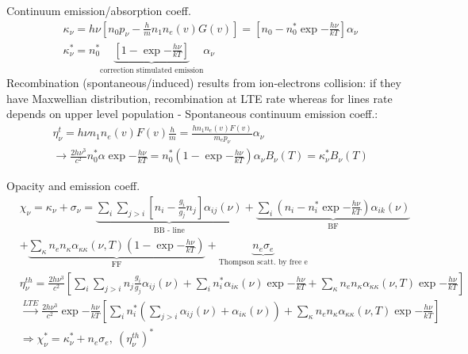 \begin{frame}{Continuum emission/absorption coeff.}
    \begin{align*}
        &\kappa_{\nu}=h\nu[n_0p_{\nu}-\frac{h}{m}n_1n_e(v)G(v)]=[n_0-n_0^*\exp{-\frac{h\nu}{kT}}]\alpha_{\nu}\\
        &\kappa_{\nu}^*=n_0^*\underbrace{[1-\exp{-\frac{h\nu}{kT}}]}_{\text{correction stimulated emission}}\alpha_{\nu}\tag{LTE}
    \end{align*}
    Recombination (spontaneous/induced) results from ion-electrons collision: if they have Maxwellian distribution, recombination at LTE rate whereas for lines rate depends on upper level population - Spontaneous continuum emission coeff.:
\begin{align*}
    &\eta_{\nu}^t=h\nu n_1n_e(v)F(v)\frac{h}{m}=\frac{hn_1n_e(v)F(v)}{m_ep_{\nu}}\alpha_{\nu}\\
    &\to\frac{2h\nu^3}{c^2}n_0^*\alpha\exp{-\frac{h\nu}{kT}}=n_0^*(1-\exp{-\frac{h\nu}{kT}})\alpha_{\nu}B_{\nu}(T)=\kappa_{\nu}^*B_{\nu}(T)
\end{align*}
\end{frame}

\begin{frame}{Opacity and emission coeff.}
    \begin{align*}
        &\chi_{\nu}=\kappa_{\nu}+\sigma_{\nu}=\underbrace{\sum_i\sum_{j>i}[n_i-\frac{g_i}{g_j}n_j]\alpha_{ij}(\nu)}_{\text{BB - line}}+\underbrace{\sum_i(n_i-n_i^*\exp{-\frac{h\nu}{kT}})\alpha_{ik}(\nu)}_{\text{BF}}\\
        &+\underbrace{\sum_{\kappa}n_en_{\kappa}\alpha_{\kappa\kappa}(\nu,T)(1-\exp{-\frac{h\nu}{kT}})}_{\text{FF}}+\underbrace{n_e\sigma_e}_{\text{Thompson scatt. by free e}}\\
        &\eta_{\nu}^{th}=\frac{2h\nu^3}{c^2}[\sum_i\sum_{j>i}n_j \frac{g_i}{g_j}\alpha_{ij}(\nu)+\sum_in_i^*\alpha_{i\kappa}(\nu)\exp{-\frac{h\nu}{kT}}+\sum_{\kappa}n_en_{\kappa}\alpha_{\kappa\kappa}(\nu,T)\exp{-\frac{h\nu}{kT}}]\\
        &\xrightarrow{LTE}\frac{2h\nu^3}{c^2}\exp{-\frac{h\nu}{kT}}[\sum_in_i^* (\sum_{j>i}\alpha_{ij}(\nu)+\alpha_{i\kappa}(\nu))+\sum_{\kappa}n_en_{\kappa}\alpha_{\kappa\kappa}(\nu,T)\exp{-\frac{h\nu}{kT}}]\\
        &\Rightarrow\chi_{\nu}^*=\kappa_{\nu}^*+n_e\sigma_e,\ (\eta_{\nu}^{th})^*
    \end{align*}
\end{frame}

